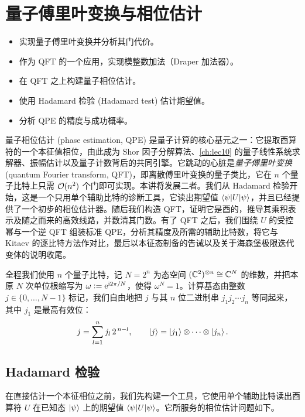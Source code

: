 \chapter{量子傅里叶变换与相位估计}
\label{ch:lec04}

\begin{objectives}
\begin{itemize}[leftmargin=1.4em,nosep]
  \item 实现量子傅里叶变换并分析其门代价。
  \item 作为 QFT 的一个应用，实现模整数加法（Draper 加法器）。
  \item 在 QFT 之上构建量子相位估计。
  \item 使用 Hadamard 检验 (Hadamard test) 估计期望值。
  \item 分析 QPE 的精度与成功概率。
\end{itemize}
\end{objectives}


量子相位估计 (phase estimation, QPE) 是量子计算的核心基元之一：它提取酉算符的一个本征值相位，由此成为 Shor 因子分解算法、\cref{ch:lec10} 的量子线性系统求解器、振幅估计以及量子计数背后的共同引擎。它跳动的心脏是\emph{量子傅里叶变换} (quantum Fourier transform, QFT)，即离散傅里叶变换的量子类比，它在 $n$ 个量子比特上只需 $\mathcal{O}(n^2)$ 个门即可实现。本讲将发展二者。我们从 Hadamard 检验开始，这是一个只用单个辅助比特的诊断工具，它读出期望值 $\braket{\psi|U|\psi}$，并且已经提供了一个初步的相位估计器。随后我们构造 QFT，证明它是酉的，推导其乘积表示及随之而来的高效线路，并数清其门数。有了 QFT 之后，我们围绕 $U$ 的受控幂与一个逆 QFT 组装标准 QPE，分析其精度及所需的辅助比特数，将它与 Kitaev 的逐比特方法作对比，最后以本征态制备的告诫以及关于海森堡极限迭代变体的说明收尾。

全程我们使用 $n$ 个量子比特，记 $N=2^{n}$ 为态空间 $(\mathbb{C}^2)^{\otimes n}\cong\mathbb{C}^{N}$ 的维数，并把本原 $N$ 次单位根缩写为 $\omega\vcentcolon=\mathrm{e}^{\mathrm{i} 2\pi/N}$，使得 $\omega^{N}=1$。计算基态由整数 $j\in\{0,\dots,N-1\}$ 标记，我们自由地把 $j$ 与其 $n$ 位二进制串 $j_1 j_2\cdots j_n$ 等同起来，其中 $j_1$ 是最高有效位：
\[
  j=\sum_{l=1}^{n} j_l\, 2^{\,n-l},
  \qquad \ket{j}=\ket{j_1}\otimes\cdots\otimes\ket{j_n}.
\]

\section{Hadamard 检验}
\label{sec:lec04-1}

在直接估计一个本征相位之前，我们先构建一个工具，它使用单个辅助比特读出酉算符 $U$ 在已知态 $\ket{\psi}$ 上的期望值 $\braket{\psi|U|\psi}$。它所服务的相位估计问题如下。

